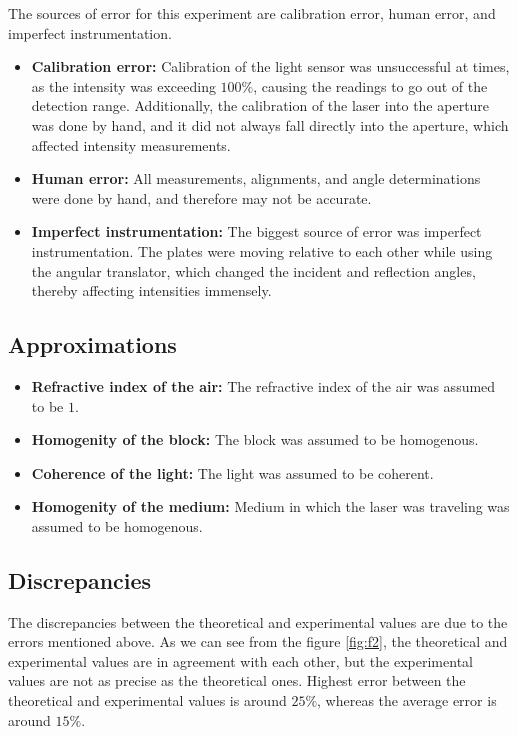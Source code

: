 \documentclass[10pt]{article}
\begin{document}
The sources of error for this experiment are calibration error, human error, and imperfect instrumentation.
\begin{itemize}
  \item \textbf{Calibration error:} Calibration of the light sensor was unsuccessful at times, as the intensity was exceeding $100\%$, causing the readings to go out of the detection range. Additionally, the calibration of the laser into the aperture was done by hand, and it did not always fall directly into the aperture, which affected intensity measurements.
  \item \textbf{Human error:} All measurements, alignments, and angle determinations were done by hand, and therefore may not be accurate.
  \item \textbf{Imperfect instrumentation:} The biggest source of error was imperfect instrumentation. The plates were moving relative to each other while using the angular translator, which changed the incident and reflection angles, thereby affecting intensities immensely.
\end{itemize}

\subsection*{Approximations}

\begin{itemize}
  \item \textbf{Refractive index of the air:} The refractive index of the air was assumed to be $1$.
  \item \textbf{Homogenity of the block:} The block was assumed to be homogenous.
  \item \textbf{Coherence of the light:} The light was assumed to be coherent.
  \item \textbf{Homogenity of the medium:} Medium in which the laser was traveling was assumed to be homogenous.
\end{itemize}

\subsection*{Discrepancies}

The discrepancies between the theoretical and experimental values are due to the errors mentioned above. As we can see from the figure \ref*{fig:f2}, the theoretical and experimental values are in agreement with each other, but the experimental values are not as precise as the theoretical ones. Highest error between the theoretical and experimental values is around $25\%$, whereas the average error is around $15\%$.  
\end{document}

